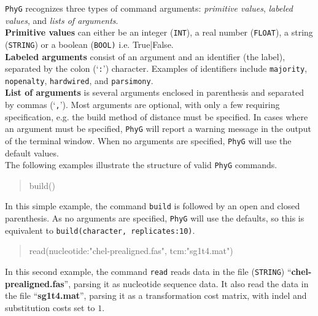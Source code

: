 \documentclass[11pt]{book}
\newcommand{\phyg}{\texttt{PhyG} }
\begin{document}
{{		\noindent \phyg recognizes three types of command arguments: \textit{primitive values}, 
		\textit{labeled values}, and \textit{lists of arguments}.\\
		
		\noindent \textbf{Primitive values} can either be an integer (\texttt{INT}), 
		a real number (\texttt{FLOAT}), a string (\texttt{STRING}) or a boolean (\texttt{BOOL)} 
		i.e. True|False. \\
		
		\noindent \textbf{Labeled arguments} consist of an argument and an identifier 
		(the label), separated by the colon (`\texttt{:}') character. Examples of 
		identifiers include \texttt{majority}, \texttt{nopenalty}, \texttt{hardwired}, and 
		\texttt{parsimony}. \\
		
		\noindent \textbf{List of arguments} is several arguments enclosed in parenthesis 
		and separated by commas (`\texttt{,}'). Most arguments are optional, with only a 
		few requiring specification, e.g. the build method of distance must be specified. 
		In cases where an argument must be specified, \phyg will report a warning message 
		in the output of the terminal window. When no arguments are specified, \phyg will 
		use the default values.\\
		
		\noindent The following examples illustrate the structure of valid \phyg commands. 
					
		\begin{quote}
		build()
		\end{quote}
		
		\noindent In this simple example, the command \texttt{build} is followed by an open 
		and closed parenthesis. As no arguments are specified, \phyg will use the defaults, 
		so this is equivalent to \texttt{build(character, replicates:10)}.	
			
		\begin{quote}
		read(nucleotide:"chel-prealigned.fas", tcm:"sg1t4.mat")
		\end{quote}		

		\noindent In this second example, the command \texttt{read} reads data in the file
		(\texttt{STRING}) ``\textbf{chel-prealigned.fas}'', parsing it as nucleotide sequence data. 
		It also read the data in the file ``\textbf{sg1t4.mat}'', parsing it as a transformation cost matrix, 
		with indel and substitution costs set to $1$.
		
}}
\end{document}

